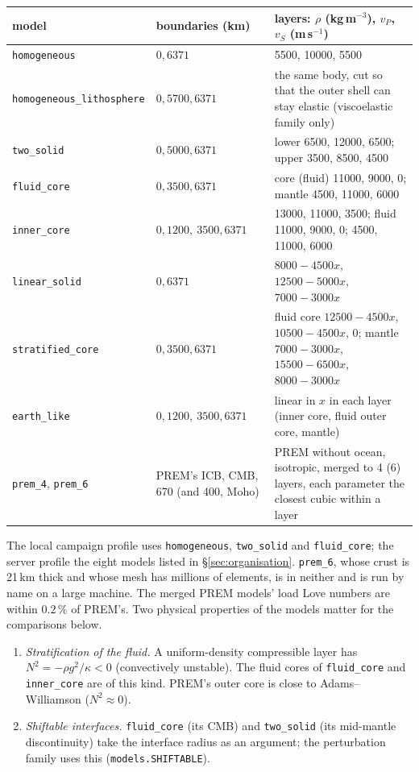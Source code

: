 \documentclass[11pt]{article}
\numberwithin{equation}{section}
\newcommand{\code}[1]{\texttt{#1}}
\begin{document}
\begin{center}
\small
\begin{tabular}{@{}lP{2.5cm}P{8.8cm}@{}}
\toprule
model & boundaries (km) & layers: $\rho$ (kg\,m$^{-3}$), $v_P$, $v_S$ (m\,s$^{-1}$) \\
\midrule
\code{homogeneous} & $0, 6371$ & 5500, 10000, 5500 \\
\code{homogeneous\_lithosphere} & $0, 5700, 6371$ & the same body, cut so that the outer shell can stay elastic (viscoelastic family only) \\
\code{two\_solid} & $0, 5000, 6371$ & lower 6500, 12000, 6500; upper 3500, 8500, 4500 \\
\code{fluid\_core} & $0, 3500, 6371$ & core (fluid) 11000, 9000, 0; mantle 4500, 11000, 6000 \\
\code{inner\_core} & $0, 1200,\allowbreak\ 3500, 6371$ & 13000, 11000, 3500; fluid 11000, 9000, 0; 4500, 11000, 6000 \\
\code{linear\_solid} & $0, 6371$ & $8000-4500x$, $12500-5000x$, $7000-3000x$ \\
\code{stratified\_core} & $0, 3500, 6371$ & fluid core $12500-4500x$, $10500-4500x$, 0; mantle $7000-3000x$, $15500-6500x$, $8000-3000x$ \\
\code{earth\_like} & $0, 1200,\allowbreak\ 3500, 6371$ & linear in $x$ in each layer (inner core, fluid outer core, mantle) \\
\code{prem\_4}, \code{prem\_6} & PREM's ICB, CMB, 670 (and 400, Moho) & PREM without ocean, isotropic, merged to 4 (6) layers, each parameter the closest cubic within a layer \\
\bottomrule
\end{tabular}
\end{center}

\noindent The local campaign profile uses \code{homogeneous},
\code{two\_solid} and \code{fluid\_core}; the server profile the eight
models listed in \S\ref{sec:organisation}. \code{prem\_6}, whose crust is
21\,km thick and whose mesh has millions of elements, is in neither and is
run by name on a large machine. The merged PREM models' load Love numbers
are within $0.2\,\%$ of PREM's. Two physical properties of the models
matter for the comparisons below.
\begin{enumerate}[leftmargin=*]
\item \emph{Stratification of the fluid.} A uniform-density compressible
  layer has $N^2=-\rho g^2/\kappa<0$ (convectively unstable). The fluid
  cores of \code{fluid\_core} and \code{inner\_core} are of this kind.
  PREM's outer core is close to Adams--Williamson ($N^2\approx 0$).
\item \emph{Shiftable interfaces.} \code{fluid\_core} (its CMB) and
  \code{two\_solid} (its mid-mantle discontinuity) take the interface
  radius as an argument; the perturbation family uses this
  (\code{models.SHIFTABLE}).
\end{enumerate}
\end{document}
